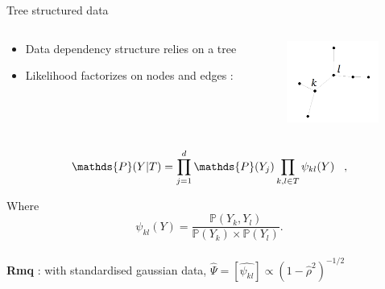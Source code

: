 \documentclass[9pt]{beamer}
\newcommand{\emphase}[1]{\textcolor{Complement}{#1}}
\begin{document}
\begin{frame}{Tree structured data}
\begin{columns}
 \begin{column}{0.7\linewidth}
 \begin{itemize}
    \item Data dependency structure relies on a tree \vspace{1cm}
    \item Likelihood \emphase{factorizes on nodes and edges} \cite{ChowLiu}:
    \end{itemize}
 \end{column}
 \begin{column}{0.3\linewidth}
 \begin{center}
     \includegraphics[width=3cm]{arbredependance.PNG}   
    \end{center}
 \end{column}
\end{columns}

\[\mathds{P}(Y|T) =\prod_{j=1}^d \mathds{P}(Y_j)\prod_{k,l \in T}\psi_{kl}(Y) \hspace{0.3cm},\]

Where \[ \psi_{kl}(Y) = \frac{\mathds{P}(Y_k,Y_l)}{\mathds{P}(Y_k)\times \mathds{P}(Y_l)}.\]\\
\vspace{0.4cm}
\textbf{Rmq} : with standardised gaussian data, $\hat{\Psi} = [\hat{\psi_{kl}}] \propto (1-\hat{\rho}^2)^{-1/2}$
\end{frame}

\end{document}

